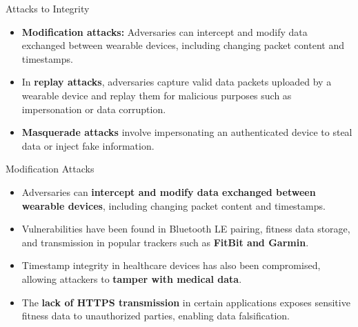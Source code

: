 \documentclass[ucs,9pt,usenames,dvipsnames]{beamer}
\begin{document}
\begin{frame}{Attacks to Integrity}
	
	\begin{itemize}
		\item \textbf{Modification attacks:} Adversaries can intercept and modify data exchanged between wearable devices, including changing packet content and timestamps.
		
		\item  In \textbf{replay attacks}, adversaries capture valid data packets uploaded by a wearable device and replay them for malicious purposes such as impersonation or data corruption.
		
		\item \textbf{Masquerade attacks} involve impersonating an authenticated device to steal data or inject fake information.
	\end{itemize}
\end{frame}


\iffalse
\begin{frame}{Modification Attacks}
	\begin{itemize}
		\item Adversaries can \textbf{intercept and modify data exchanged between wearable devices}, including changing packet content and timestamps.
		\item Vulnerabilities have been found in Bluetooth LE pairing, fitness data storage, and transmission in popular trackers such as \textbf{FitBit and Garmin}.
		\item Timestamp integrity in healthcare devices has also been compromised, allowing attackers to \textbf{tamper with medical data}.
		\item The \textbf{lack of HTTPS transmission} in certain applications exposes sensitive fitness data to unauthorized parties, enabling data falsification.
	\end{itemize}
\end{frame}
\end{document}
